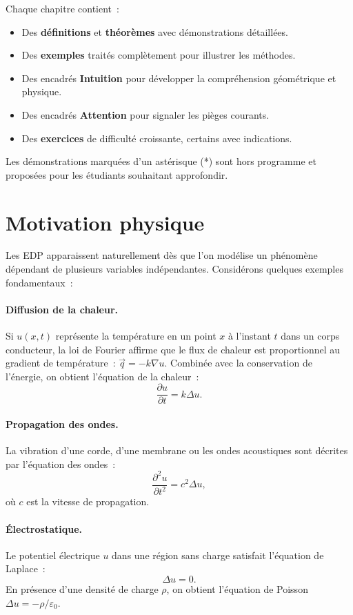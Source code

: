 Chaque chapitre contient~:
\begin{itemize}
    \item Des \textbf{d\'efinitions} et \textbf{th\'eor\`emes} avec d\'emonstrations
          d\'etaill\'ees.
    \item Des \textbf{exemples} trait\'es compl\`etement pour illustrer les m\'ethodes.
    \item Des encadr\'es \og \textbf{Intuition} \fg pour d\'evelopper la compr\'ehension
          g\'eom\'etrique et physique.
    \item Des encadr\'es \og \textbf{Attention} \fg pour signaler les pi\`eges courants.
    \item Des \textbf{exercices} de difficult\'e croissante, certains avec indications.
\end{itemize}

Les d\'emonstrations marqu\'ees d'un ast\'erisque (*) sont hors programme et
propos\'ees pour les \'etudiants souhaitant approfondir.

\section*{Motivation physique}

Les EDP apparaissent naturellement d\`es que l'on mod\'elise un ph\'enom\`ene
d\'ependant de plusieurs variables ind\'ependantes. Consid\'erons quelques exemples
fondamentaux~:

\paragraph{Diffusion de la chaleur.}
Si $u(x,t)$ repr\'esente la temp\'erature en un point $x$ \`a l'instant $t$ dans
un corps conducteur, la loi de Fourier affirme que le flux de chaleur est
proportionnel au gradient de temp\'erature~: $\vec{q} = -k\nabla u$. Combin\'ee
avec la conservation de l'\'energie, on obtient l'\'equation de la chaleur~:
\[
    \frac{\partial u}{\partial t} = k \Delta u.
\]

\paragraph{Propagation des ondes.}
La vibration d'une corde, d'une membrane ou les ondes acoustiques sont d\'ecrites
par l'\'equation des ondes~:
\[
    \frac{\partial^2 u}{\partial t^2} = c^2 \Delta u,
\]
o\`u $c$ est la vitesse de propagation.

\paragraph{\'Electrostatique.}
Le potentiel \'electrique $u$ dans une r\'egion sans charge satisfait l'\'equation
de Laplace~:
\[
    \Delta u = 0.
\]
En pr\'esence d'une densit\'e de charge $\rho$, on obtient l'\'equation de Poisson
$\Delta u = -\rho/\varepsilon_0$.

